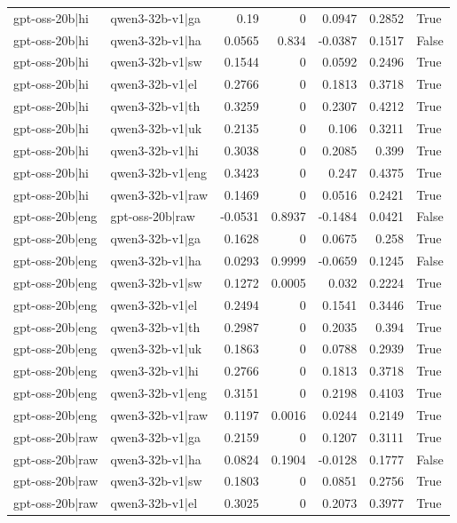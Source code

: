 \begin{table}
\begin{tabular}{l l r r r r l}
gpt-oss-20b|hi & qwen3-32b-v1|ga & 0.19 & 0 & 0.0947 & 0.2852 & True \\
gpt-oss-20b|hi & qwen3-32b-v1|ha & 0.0565 & 0.834 & -0.0387 & 0.1517 & False \\
gpt-oss-20b|hi & qwen3-32b-v1|sw & 0.1544 & 0 & 0.0592 & 0.2496 & True \\
gpt-oss-20b|hi & qwen3-32b-v1|el & 0.2766 & 0 & 0.1813 & 0.3718 & True \\
gpt-oss-20b|hi & qwen3-32b-v1|th & 0.3259 & 0 & 0.2307 & 0.4212 & True \\
gpt-oss-20b|hi & qwen3-32b-v1|uk & 0.2135 & 0 & 0.106 & 0.3211 & True \\
gpt-oss-20b|hi & qwen3-32b-v1|hi & 0.3038 & 0 & 0.2085 & 0.399 & True \\
gpt-oss-20b|hi & qwen3-32b-v1|eng & 0.3423 & 0 & 0.247 & 0.4375 & True \\
gpt-oss-20b|hi & qwen3-32b-v1|raw & 0.1469 & 0 & 0.0516 & 0.2421 & True \\
gpt-oss-20b|eng & gpt-oss-20b|raw & -0.0531 & 0.8937 & -0.1484 & 0.0421 & False \\
gpt-oss-20b|eng & qwen3-32b-v1|ga & 0.1628 & 0 & 0.0675 & 0.258 & True \\
gpt-oss-20b|eng & qwen3-32b-v1|ha & 0.0293 & 0.9999 & -0.0659 & 0.1245 & False \\
gpt-oss-20b|eng & qwen3-32b-v1|sw & 0.1272 & 0.0005 & 0.032 & 0.2224 & True \\
gpt-oss-20b|eng & qwen3-32b-v1|el & 0.2494 & 0 & 0.1541 & 0.3446 & True \\
gpt-oss-20b|eng & qwen3-32b-v1|th & 0.2987 & 0 & 0.2035 & 0.394 & True \\
gpt-oss-20b|eng & qwen3-32b-v1|uk & 0.1863 & 0 & 0.0788 & 0.2939 & True \\
gpt-oss-20b|eng & qwen3-32b-v1|hi & 0.2766 & 0 & 0.1813 & 0.3718 & True \\
gpt-oss-20b|eng & qwen3-32b-v1|eng & 0.3151 & 0 & 0.2198 & 0.4103 & True \\
gpt-oss-20b|eng & qwen3-32b-v1|raw & 0.1197 & 0.0016 & 0.0244 & 0.2149 & True \\
gpt-oss-20b|raw & qwen3-32b-v1|ga & 0.2159 & 0 & 0.1207 & 0.3111 & True \\
gpt-oss-20b|raw & qwen3-32b-v1|ha & 0.0824 & 0.1904 & -0.0128 & 0.1777 & False \\
gpt-oss-20b|raw & qwen3-32b-v1|sw & 0.1803 & 0 & 0.0851 & 0.2756 & True \\
gpt-oss-20b|raw & qwen3-32b-v1|el & 0.3025 & 0 & 0.2073 & 0.3977 & True \\

\end{tabular}
\end{table}
